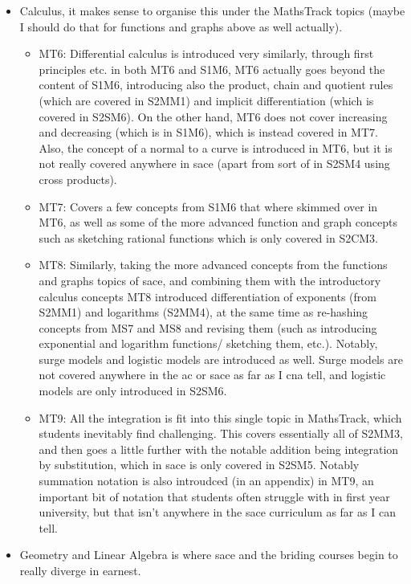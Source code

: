 \documentclass[twoside,12pt,a4paper]{report}
\begin{document}
\begin{itemize}
\begin{itemize}
		\end{itemize}
	\item Calculus, it makes sense to organise this under the MathsTrack topics (maybe I should do that for functions and graphs above as well actually).
		\begin{itemize}
			\item MT6: Differential calculus is introduced very similarly, through first principles etc. in both MT6 and S1M6, MT6 actually goes beyond the content of S1M6, introducing also the product, chain and quotient rules (which are covered in S2MM1) and implicit differentiation (which is covered in S2SM6). On the other hand, MT6 does not cover increasing and decreasing (which is in S1M6), which is instead covered in MT7. Also, the concept of a normal to a curve is introduced in MT6, but it is not really covered anywhere in \gls{sace} (apart from sort of in S2SM4 using cross products).
			\item MT7: Covers a few concepts from S1M6 that where skimmed over in MT6, as well as some of the more advanced function and graph concepts such as sketching rational functions which is only covered in S2CM3.
			\item MT8: Similarly, taking the more advanced concepts from the functions and graphs topics of \gls{sace}, and combining them with the introductory calculus concepts MT8 introduced differentiation of exponents  (from S2MM1) and logarithms (S2MM4), at the same time as re-hashing concepts from MS7 and MS8 and revising them (such as introducing exponential and logarithm functions/ sketching them, etc.).  Notably, surge models and logistic models are introduced as well. Surge models are not covered anywhere in the \gls{ac} or \gls{sace} as far as I cna tell, and logistic models are only introduced in S2SM6.
			\item MT9: All the integration is fit into this single topic in MathsTrack, which students inevitably find challenging. This covers essentially all of S2MM3, and then goes a little further with the notable addition being integration by substitution, which in \gls{sace} is only covered in S2SM5. Notably summation notation is also introudced (in an appendix) in MT9, an important bit of notation that students often struggle with in first year university, but that isn't anywhere in the \gls{sace} curriculum as far as I can tell.
		\end{itemize}
	\item Geometry and Linear Algebra is where \gls{sace} and the briding courses begin to really diverge in earnest.

\end{itemize}
\end{document}
